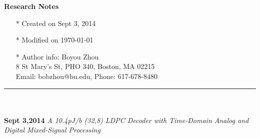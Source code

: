 \documentclass[]{article}
\begin{document}
\pagestyle{empty}
{\large\textbf{Research Notes}}
\begin{itemize}
    \item[*] Created on Sept 3, 2014
    \item[*] Modified on \today
    \item[*] Author info: Boyou Zhou\\
             8 St Mary's St, PHO 340, Boston, MA 02215\\
             Email: bobzhou@bu.edu, Phone: 617-678-8480
\end{itemize}


\rule[-0.1cm]{7.5in}{0.01cm}\\
\\
\noindent \textbf{Sept 3,2014}
\textit{A 10.4pJ/b (32,8) LDPC Decoder with Time-Domain Analog and Digital Mixed-Signal Processing}
\end{document}
